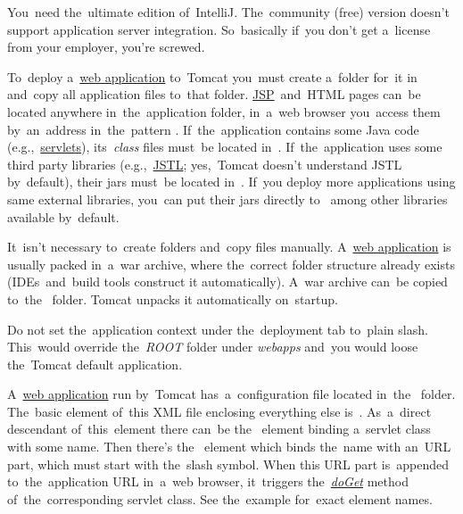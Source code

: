 \warning You~need the~ultimate edition of~IntelliJ\@.
The~community (free) version doesn't support application server integration.
So~basically if~you don't get a~license from your employer, you're screwed.

\label{tomcatdeployment}
To~deploy a~\hyperref[webserviceapplication]{web application} to~Tomcat you~must create a~folder for~it in~ and~copy all application files to~that folder.
\hyperref[jsp]{JSP}~and~HTML pages can~be located anywhere in~the~application folder, in~a~web browser you~access them by~an~address in~the~pattern .
If~the~application contains some Java code (e.g.,~\hyperref[servlet]{servlets}), its~\textit{class} files must~be located in~.
If~the~application uses some third party libraries (e.g.,~\hyperref[jstl]{JSTL}; yes,~Tomcat doesn't understand JSTL by~default), their jars must~be located in~.
If~you deploy more applications using same external libraries, you~can put their jars directly to~ among other libraries available by~default.

It~isn't necessary to~create folders and~copy files manually.
A~\hyperref[webserviceapplication]{web application} is usually packed in~a~war archive, where the~correct folder structure already exists (IDEs~and~build tools construct it automatically).
A~war archive can~be copied to~the~ folder.
Tomcat unpacks it automatically on~startup.


\warning Do not set the~application context under the~deployment tab to~plain slash.
This~would override the~\textit{ROOT} folder under \textit{webapps} and~you would loose the~Tomcat default application.

\label{servleturl}
A~\hyperref[webserviceapplication]{web application} run by~Tomcat has~a~configuration file  located in~the~ folder.
The~basic element of~this XML file enclosing everything else is~.
As~a~direct descendant of~this~element there can~be the~ element binding a~servlet class with some name.
Then there's the~ element which binds the~name with an~URL part, which must start with the~slash symbol.
When this URL part is~appended to~the~application URL in~a~web browser, it~triggers the~\hyperref[servicedopostdoget]{\textit{doGet}} method of~the~corresponding servlet class.
See the~example for~exact element names.

